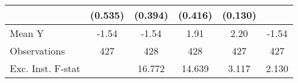 {\begin{tabular}{l*{5}{c}}
            &     (0.535)         &     (0.394)         &     (0.416)         &     (0.130)         &                     \\
\midrule
Mean Y      &       -1.54         &       -1.54         &        1.91         &        2.20         &       -1.54         \\
Observations&         427         &         428         &         428         &         427         &         427         \\
Exc. Inst. F-stat&                     &      16.772         &      14.639         &       3.117         &       2.130         \\
\bottomrule
\end{tabular}
}
